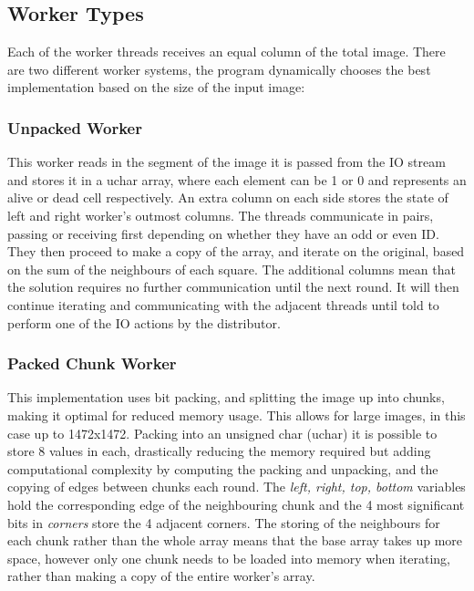 \documentclass[11pt, oneside]{article}
\begin{document}
\subsection{Worker Types}
\vspace{-2mm}
Each of the worker threads receives an equal column of the total image. There are two different worker systems, the program dynamically chooses the best implementation based on the size of the input image:

\vspace{-4mm}
\subsubsection{Unpacked Worker}
\vspace{-3mm}

This worker reads in the segment of the image it is passed from the IO stream and stores it in a uchar array, where each element can be 1 or 0 and represents an alive or dead cell respectively. An extra column on each side stores the state of left and right worker's outmost columns. The threads communicate in pairs, passing or receiving first depending on whether they have an odd or even ID. They then proceed to make a copy of the array, and iterate on the original, based on the sum of the neighbours of each square. The additional columns mean that the solution requires no further communication until the next round. It will then continue iterating and communicating with the adjacent threads until told to perform one of the IO actions by the distributor.

\vspace{-4mm}
\subsubsection{Packed Chunk Worker}
\vspace{-3mm}

This implementation uses bit packing, and splitting the image up into chunks, making it optimal for reduced memory usage. This allows for large images, in this case up to 1472x1472.
Packing into an unsigned char (uchar) it is possible to store 8 values in each, drastically reducing the memory required but adding computational complexity by computing the packing and unpacking, and the copying of edges between chunks each round. The \emph{left, right, top, bottom} variables hold the corresponding edge of the neighbouring chunk and the 4 most significant bits in \emph{corners} store the 4 adjacent corners. The storing of the neighbours for each chunk rather than the whole array means that the base array takes up more space, however only one chunk needs to be loaded into memory when iterating, rather than making a copy of the entire worker's array.
\end{document}
